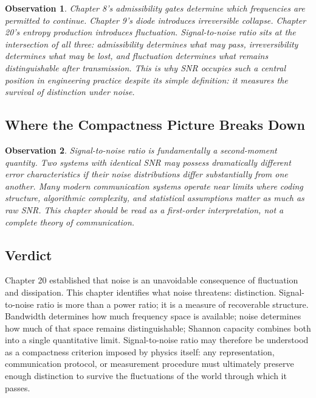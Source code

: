\documentclass[12pt]{article}
\newtheorem{observation}{Observation}
\begin{document}
\begin{observation}
Chapter 8's admissibility gates determine which frequencies are permitted to continue. Chapter 9's diode introduces irreversible collapse. Chapter 20's entropy production introduces fluctuation. Signal-to-noise ratio sits at the intersection of all three: admissibility determines what may pass, irreversibility determines what may be lost, and fluctuation determines what remains distinguishable after transmission. This is why SNR occupies such a central position in engineering practice despite its simple definition: it measures the survival of distinction under noise.
\end{observation}

\subsection{Where the Compactness Picture Breaks Down}

\begin{observation}
Signal-to-noise ratio is fundamentally a second-moment quantity. Two systems with identical SNR may possess dramatically different error characteristics if their noise distributions differ substantially from one another. Many modern communication systems operate near limits where coding structure, algorithmic complexity, and statistical assumptions matter as much as raw SNR. This chapter should be read as a first-order interpretation, not a complete theory of communication.
\end{observation}

\subsection{Verdict}

Chapter 20 established that noise is an unavoidable consequence of fluctuation and dissipation. This chapter identifies what noise threatens: distinction. Signal-to-noise ratio is more than a power ratio; it is a measure of recoverable structure. Bandwidth determines how much frequency space is available; noise determines how much of that space remains distinguishable; Shannon capacity combines both into a single quantitative limit. Signal-to-noise ratio may therefore be understood as a compactness criterion imposed by physics itself: any representation, communication protocol, or measurement procedure must ultimately preserve enough distinction to survive the fluctuations of the world through which it passes.
\end{document}
